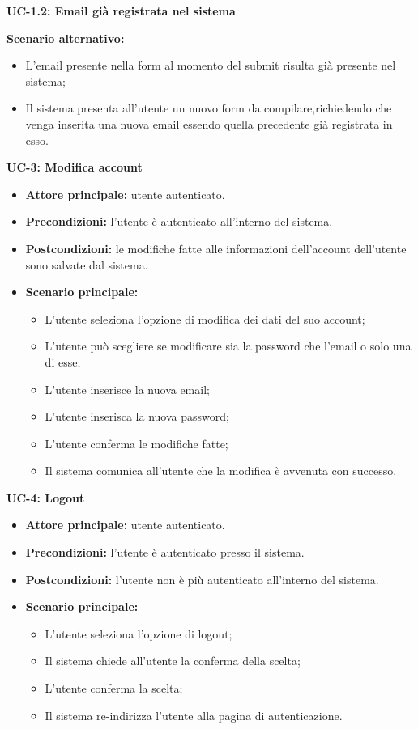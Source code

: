 \textbf{UC-1.2: Email già registrata nel sistema}

\textbf{Scenario alternativo:}
    \begin{itemize}
        \item L'email presente nella form al momento del submit risulta già presente nel sistema;
        \item Il sistema presenta all'utente un nuovo form da compilare,richiedendo che venga inserita
        una nuova email essendo quella precedente già registrata in esso.
    \end{itemize}

\break

\textbf{UC-3: Modifica account }
\begin{itemize}
    \item \textbf{Attore principale:} utente autenticato.
    \item \textbf{Precondizioni:} l'utente è autenticato all'interno del sistema.
    \item \textbf{Postcondizioni:} le modifiche fatte alle informazioni dell'account dell'utente sono
    salvate dal sistema.
    \item \textbf{Scenario principale:}
        \begin{itemize}
            \item L'utente seleziona l'opzione di modifica dei dati del suo account;
            \item L'utente può scegliere se modificare sia la password che l'email o solo una
            di esse;
            \item L'utente inserisce la nuova email;
            \item L'utente inserisca la nuova password;
            \item L'utente conferma le modifiche fatte;
            \item Il sistema comunica all'utente che la modifica è avvenuta con successo.
        \end{itemize}
\end{itemize}

\textbf{UC-4: Logout}
\begin{itemize}
    \item \textbf{Attore principale:} utente autenticato.
    \item \textbf{Precondizioni:} l'utente è autenticato presso il sistema.
    \item \textbf{Postcondizioni:} l'utente non è più autenticato all'interno del sistema.
    \item \textbf{Scenario principale:}
    \begin{itemize}
        \item L'utente seleziona l'opzione di logout;
        \item Il sistema chiede all'utente la conferma della scelta;
        \item L'utente conferma la scelta;
        \item Il sistema re-indirizza l'utente alla pagina di autenticazione.
    \end{itemize}
\end{itemize}

